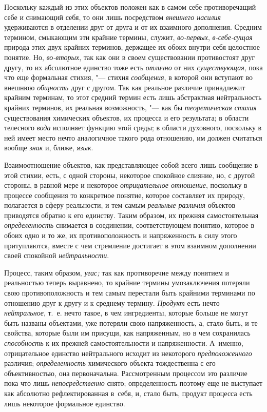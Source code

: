 Поскольку каждый из этих объектов положен как в самом себе
противоречащий себе и снимающий себя, то они лишь посредством
{\em внешнего насилия}
удерживаются в отделении друг от друга и от их
взаимного дополнения. Средним термином, смыкающим эти
крайние термины, служит,
{\em во-первых},
{\em в-себе-сущая} природа
этих двух крайних терминов, держащее их обоих внутри себя целостное
понятие. Но, {\em во-вторых},
так как они в своем существовании противостоят друг другу, то
их абсолютное единство тоже есть
{\em отлично} от них
{\em существующая}, пока
что еще формальная стихия, "--- стихия
{\em сообщения}, в
которой они вступают во внешнюю
{\em общность} друг с
другом. Так как реальное различие принадлежит крайним терминам, то этот
средний термин есть лишь абстрактная нейтральность крайних терминов, их
реальная возможность, "--- как бы
{\em теоретическая стихия}
существования химических объектов, их процесса и его
результата; в области телесного
{\em вода} исполняет
функцию этой среды; в области духовного, поскольку в ней имеет место нечто
аналогичное такого рода отношению, им должен считаться вообще
{\em знак} и, ближе,
{\em язык}.

Взаимоотношение объектов, как представляющее собой всего лишь
сообщение в этой стихии, есть, с одной стороны, некоторое спокойное
слияние, но, с другой стороны, в равной мере и некоторое
{\em отрицательное отношение},
поскольку в процессе сообщения то конкретное понятие, которое
составляет их природу, полагается в сферу реальности, и тем самым
{\em реальные различия}
объектов приводятся обратно к его единству. Таким образом, их
прежняя самостоятельная
{\em определенность}
снимается в соединении, соответствующем понятию, которое в
обоих одно и то же, их противоположность и напряженность в силу этого
притупляются, вместе с чем стремление достигает в этом взаимном дополнении
своей спокойной {\em нейтральности}.

Процесс, таким образом,
{\em угас;} так как
противоречие между понятием и реальностью теперь выравнено, то крайние
термины умозаключения потеряли свою противоположность и тем самым перестали
быть крайними терминами по отношению друг к другу и к среднему термину.
{\em Продукт} есть нечто
{\em нейтральное}, т.~е.
нечто такое, в чем ингредиенты, которые больше не могут быть названы
объектами, уже потеряли свою напряженность, а, стало быть, и те свойства,
которые были им присущи, как напряженным, но в чем сохранилась
{\em способность} к их
прежней самостоятельности и напряженности. А~именно, отрицательное единство
нейтрального исходит из некоторого
{\em предположенного}
различия;
{\em определенность}
химического объекта тождественна с его объективностью, она
первоначальна. Рассмотренным процессом это различие пока что лишь
{\em непосредственно}
снято; определенность поэтому еще не выступает
как абсолютно рефлектированная в~себя, и, стало быть, продукт процесса есть
лишь некоторое формальное единство.

